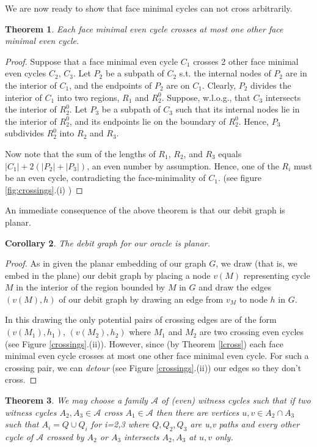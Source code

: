 \documentclass[letterpaper,11pt]{article}
\newtheorem{theorem}{Theorem}[section]
\newtheorem{cor}[theorem]{Corollary}
\newcommand{\0}{\mathbb{0}}
\newcommand{\1}{\mathbb{1}}
\begin{document}
We are now ready to show that face minimal cycles can not cross
arbitrarily. 

\begin{theorem}\label{1cross}
Each face minimal even cycle crosses at most one other face minimal even cycle.
\end{theorem}
\begin{proof}
Suppose that a face minimal even cycle $C_1$ crosses 2 other face minimal even cycles $C_2$, $C_3$.
Let $P_2$ be a subpath of $C_2$ s.t. the internal nodes of $P_2$ are in the interior of $C_1$, and the endpoints of $P_2$ are on $C_1$. Clearly, $P_2$ divides the interior of $C_1$ into two regions, $R_1$ and $R^0_2$. Suppose, w.l.o.g., that $C_3$ intersects the interior of $R^0_2$. Let $P_3$ be a subpath of $C_3$ such that its internal nodes lie in the interior of $R^0_2$, and its endpoints lie on the boundary of $R^0_2$. Hence, $P_3$ subdivides $R^0_2$ into $R_2$ and $R_3$.

Now note that the sum of the lengths of $R_1$, $R_2$, and $R_3$ equals $|C_1| +2(|P_2|+|P_3|)$, an even number by assumption. Hence, one of the $R_i$ must be an even cycle, contradicting the face-minimality of $C_1$. (see figure \ref{fig:crossings}.(i) )
\end{proof}

An immediate consequence of the above theorem is that our debit graph
is planar. 

\begin{cor}
The debit graph for our oracle is planar.
\end{cor}
\begin{proof}
As in \cite{GW98} given the planar embedding of our graph $G$,  we draw (that is, we embed in the plane) our  debit graph  by placing a  node  $v(M)$ representing cycle $M$  in the interior of the region bounded by $M$  in $G$   and draw the edges $(v(M),h) $  of our debit graph by drawing an edge from  $v_M$ to node $h$  in $G$. 

In this drawing the only potential pairs of crossing edges are of the
form $ (v(M_1),h_1)$, $(v(M_2),h_2)$ where $M_1$ and $M_2$ are two
crossing even cycles (see Figure \ref{crossings}.(ii)). However, since (by
Theorem \ref{lcross}) each face minimal even cycle crosses at most one
other face minimal even cycle. For such a crossing pair, we can {\em
  detour} (see Figure \ref{crossings}.(ii)) our edges so they don't cross.
\end{proof}

\begin{theorem} \label{laminar witness}
We may choose a family $\mathcal{A}$ of (even) witness cycles such that if two witness cycles $A_2, A_3 \in \mathcal{A}$ cross $A_1 \in \mathcal{A}$ then there are vertices $u,v \in A_2 \cap A_3$ such that $A_i = Q \cup Q_i$ for i=2,3 where $Q,Q_2,Q_3$  are u,v paths and every other cycle of $\mathcal{A}$  crossed by $A_2 $ or $A_3$  intersects $A_2, A_3$  at $u,v$ only. %
\end{theorem} 
\end{document}
